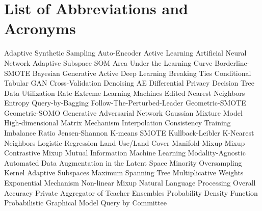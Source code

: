 {\chapter*{List of Abbreviations and Acronyms}
{
\begin{acronym}
           {Adaptive Synthetic Sampling}
               {Auto-Encoder}
               {Active Learning}
              {Artificial Neural Network}
            {Adaptive Subspace SOM}
             {Area Under the Learning Curve}
          {Borderline-SMOTE}
            {Bayesian Generative Active Deep Learning}
               {Breaking Ties}
            {Conditional Tabular GAN}
               {Cross-Validation}
              {Denoising AE}
               {Differential Privacy}
               {Decision Tree}
              {Data Utilization Rate}
              {Extreme Learning Machines}
              {Edited Nearest Neighbors}
              {Entropy Query-by-Bagging}
             {Follow-The-Perturbed-Leader}
          {Geometric-SMOTE}
           {Geometric-SOMO}
              {Generative Adversarial Network}
              {Gaussian Mixture Model}
             {High-dimensional Matrix Mechanism}
              {Interpolation Consistency Training}
               {Imbalance Ratio}
               {Jensen-Shannon}
          {K-means SMOTE}
               {Kullback-Leibler}
              {K-Nearest Neighbors}
               {Logistic Regression}
             {Land Use/Land Cover}
          {Manifold-Mixup}
             {Mixup Contrastive Mixup}
               {Mutual Information}
               {Machine Learning}
           {Modality-Agnostic Automated Data Augmentation in the
        Latent Space}
            {Minority Oversampling Kernel Adaptive Subspaces}
              {Maximum Spanning Tree}
             {Multiplicative Weights Exponential Mechanism}
         {Non-linear Mixup}
              {Natural Language Processing}
               {Overall Accuracy}
             {Private Aggregator of Teacher Ensembles}
              {Probability Density Function}
              {Probabilistic Graphical Model}
              {Query by Committee}

\end{acronym}}}
